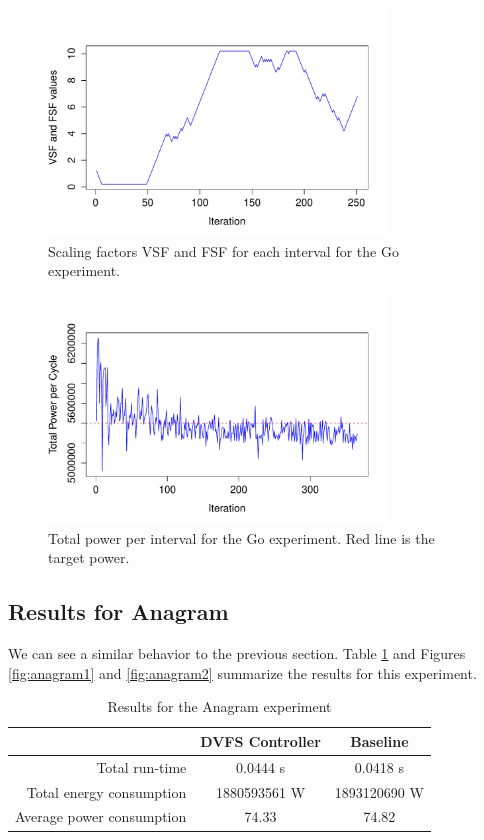 \documentclass[10pt]{scrartcl}
\begin{document}
\begin{figure}
  \centering
  \includegraphics[width=0.8\textwidth]{ScalingFactorsVsIteration}
  \caption{Scaling factors VSF and FSF for each interval for the Go experiment.}\label{fig:go1}
\end{figure}

\begin{figure}
  \centering
  \includegraphics[width=0.8\textwidth]{TotalPowerPerCycleVsIteration}
  \caption{Total power per interval for the Go experiment.  Red line is the target power.}\label{fig:go2}
\end{figure}


\subsection{Results for Anagram}
We can see a similar behavior to the previous section.  Table \ref{tab:anagram} and Figures \ref{fig:anagram1} and \ref{fig:anagram2} summarize the results for this experiment.

\begin{table}[h!]
\centering
\begin{tabular}{rcc}
\toprule
& DVFS Controller & Baseline\\
\midrule
Total run-time & 0.0444 s & 0.0418 s \\
Total energy consumption & 1880593561 W & 1893120690 W\\
Average power consumption & 74.33 & 74.82 \\
\bottomrule
\end{tabular}
\caption{Results for the Anagram experiment}\label{tab:anagram}
\end{table}
\end{document}
